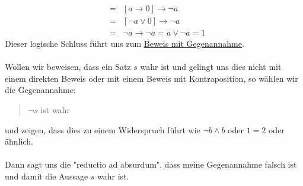 \documentclass{report}
\begin{document}
\begin{enumerate}
\begin{eqnarray}
&=&[a \to 0] \to \lnot a \nonumber \\
&=&[\lnot a \lor 0] \to \lnot a \nonumber \\
&=&\lnot a \to \lnot a = a \lor \lnot a = 1\end{eqnarray}
Dieser logische Schluss führt uns zum \underline{Beweis mit Gegenannahme}.\\\\
Wollen wir beweisen, dass ein Satz $s$ wahr ist und gelingt uns dies nicht mit einem direkten Beweis oder mit einem Beweis mit Kontraposition, so wählen wir die Gegenannahme:
\begin{quote}$\lnot s$ ist wahr\end{quote}
und zeigen, dass dies zu einem Widerspruch führt wie $\lnot b \land b$ oder $1 = 2$ oder ähnlich.\\\\
Dann sagt uns die "reductio ad absurdum", dass meine Gegenannahme falsch ist und damit die Aussage $s$ wahr ist.\end{enumerate}
\end{document}
